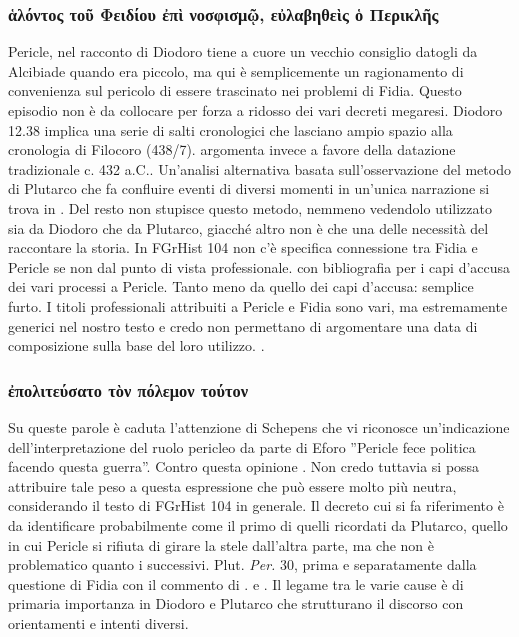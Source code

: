 {            \subsubsection{\textgreek{ἁλόντος τοῦ Φειδίου ἐπὶ νοσφισμῷ, εὐλαβηθεὶς ὁ Περικλῆς}}
            Pericle, nel racconto di  Diodoro tiene a cuore un vecchio consiglio datogli da Alcibiade quando era piccolo, ma qui è semplicemente un ragionamento di convenienza sul pericolo di essere trascinato nei problemi di Fidia. 
            Questo episodio non è da collocare per forza a ridosso dei vari decreti megaresi.  Diodoro 12.38 implica una serie di salti cronologici che lasciano ampio spazio alla cronologia di Filocoro (438/7). \cite[429 n.155]{Parmeggiani2011} argomenta invece a favore della datazione tradizionale c. 432 a.C.. Un'analisi alternativa basata sull'osservazione del metodo di Plutarco che fa confluire eventi di diversi momenti in un'unica narrazione si trova in \cite{Stadter1989}. Del resto non stupisce questo metodo, nemmeno vedendolo utilizzato sia da  Diodoro che da Plutarco, giacché altro non è che una delle necessità del raccontare la storia. In FGrHist 104 non c'è specifica connessione tra Fidia e Pericle  se non dal punto di vista professionale. \cite[430]{Parmeggiani2011} con bibliografia per i capi d'accusa dei vari processi a Pericle. Tanto meno da quello dei capi d'accusa: semplice furto. I titoli professionali attribuiti a Pericle  e Fidia sono vari, ma estremamente generici nel nostro testo e credo non permettano di argomentare una data di composizione sulla base del loro utilizzo. \cite{Marr1998}.
            
            \subsubsection{\textgreek{ἐπολιτεύσατο τὸν πόλεμον τούτον}}
            Su queste parole è caduta l'attenzione di Schepens che vi riconosce un'indicazione dell'interpretazione del ruolo pericleo da parte di Eforo ''Pericle fece politica facendo questa guerra''. Contro questa opinione \cite[455]{Parmeggiani2011}. Non credo tuttavia si possa attribuire tale peso a questa espressione che può essere molto più neutra, considerando il testo di FGrHist 104 in generale. Il decreto cui si fa riferimento è da identificare probabilmente come il primo di quelli ricordati da Plutarco, quello in cui Pericle  si rifiuta di girare la stele dall'altra parte, ma che non è problematico quanto i successivi. Plut. \emph{Per.} 30, prima e separatamente dalla questione di Fidia con il commento di \cite{Stadter1989}. e \cite{McDonald1994}. Il legame tra le varie cause è di primaria importanza in  Diodoro e Plutarco che strutturano il discorso con orientamenti e intenti diversi. 
            
}
